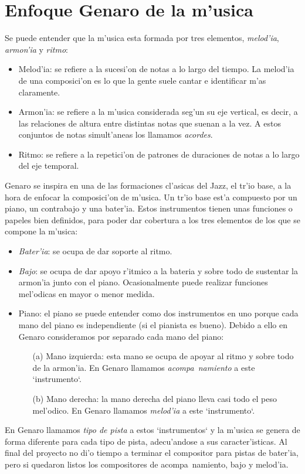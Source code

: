 \section{Enfoque Genaro de la m'usica}
Se puede entender que la m'usica esta formada por tres elementos, \emph{melod'ia}, \emph{armon'ia} y \emph{ritmo}:
\begin{itemize}
\item Melod'ia: se refiere a la sucesi'on de notas a lo largo del tiempo. La melod'ia de una composici'on es lo que la gente suele cantar e identificar m'as claramente.
\item Armon'ia: se refiere a la m'usica considerada seg'un su eje vertical, es decir, a las relaciones de altura entre distintas notas que suenan a la vez. A estos conjuntos de notas simult'aneas los llamamos \emph{acordes}.
\item Ritmo: se refiere a la repetici'on de patrones de duraciones de notas a lo largo del eje temporal.
\end{itemize}

Genaro se inspira en una de las formaciones cl'asicas del Jazz, el tr'io base, a la hora de enfocar la composici'on de m'usica. Un tr'io base est'a compuesto por un piano, un contrabajo y una bater'ia. Estos instrumentos tienen unas funciones o papeles bien definidos, para poder dar cobertura a los tres elementos de los que se compone la m'usica:
\begin{itemize}
\item \emph{Bater'ia}: se ocupa de dar soporte al ritmo.
\item \emph{Bajo}: se ocupa de dar apoyo r'itmico a la bateria y sobre todo de sustentar la armon'ia junto con el piano. Ocasionalmente puede realizar funciones mel'odicas en mayor o menor medida.
\item Piano: el piano se puede entender como dos instrumentos en uno porque cada mano del piano es independiente (si el pianista es bueno). Debido a ello en Genaro consideramos por separado cada mano del piano:
        \begin{enumerate}
        \item[(a)] Mano izquierda: esta mano se ocupa de apoyar al ritmo y sobre todo de la armon'ia. En Genaro llamamos \emph{acompa~namiento} a este `instrumento`.
        \item[(b)] Mano derecha: la mano derecha del piano lleva casi todo el peso mel'odico. En Genaro llamamos \emph{melod'ia} a este `instrumento`.
        \end{enumerate}
\end{itemize}

En Genaro llamamos \emph{tipo de pista} a estos `instrumentos` y la m'usica se genera de forma diferente para cada tipo de pista, adecu'andose a sus caracter'isticas. Al final del proyecto no di'o tiempo a terminar el compositor para pistas de bater'ia, pero si quedaron listos los compositores de acompa~namiento, bajo y melod'ia.
